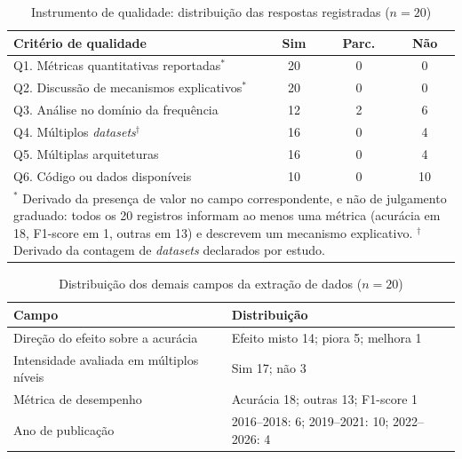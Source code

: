 \documentclass[conference]{IEEEtran}
\begin{document}
\begin{table}[htbp]
\caption{Instrumento de qualidade: distribuição das respostas registradas ($n=20$)}
\begin{center}
\footnotesize
\begin{tabular}{|p{4.5cm}|c|c|c|}
\hline
\textbf{Critério de qualidade} & \textbf{Sim} & \textbf{Parc.} & \textbf{Não} \\
\hline
Q1. Métricas quantitativas reportadas$^{\ast}$ & 20 & 0 & 0 \\
\hline
Q2. Discussão de mecanismos explicativos$^{\ast}$ & 20 & 0 & 0 \\
\hline
Q3. Análise no domínio da frequência & 12 & 2 & 6 \\
\hline
Q4. Múltiplos \textit{datasets}$^{\dagger}$ & 16 & 0 & 4 \\
\hline
Q5. Múltiplas arquiteturas & 16 & 0 & 4 \\
\hline
Q6. Código ou dados disponíveis & 10 & 0 & 10 \\
\hline
\multicolumn{4}{|p{6.9cm}|}{\footnotesize $^{\ast}$ Derivado da presença de valor no campo correspondente, e não de julgamento graduado: todos os 20 registros informam ao menos uma métrica (acurácia em 18, F1-score em 1, outras em 13) e descrevem um mecanismo explicativo. $^{\dagger}$ Derivado da contagem de \textit{datasets} declarados por estudo.} \\
\hline
\end{tabular}
\label{tab:qualidade}
\end{center}
\end{table}

\begin{table}[htbp]
\caption{Distribuição dos demais campos da extração de dados ($n=20$)}
\begin{center}
\footnotesize
\begin{tabular}{|p{3.6cm}|p{3.3cm}|}
\hline
\textbf{Campo} & \textbf{Distribuição} \\
\hline
Direção do efeito sobre a acurácia & Efeito misto 14; piora 5; melhora 1 \\
\hline
Intensidade avaliada em múltiplos níveis & Sim 17; não 3 \\
\hline
Métrica de desempenho & Acurácia 18; outras 13; F1-score 1 \\
\hline
Ano de publicação & 2016--2018: 6; 2019--2021: 10; 2022--2026: 4 \\
\hline
\end{tabular}
\label{tab:extracao}
\end{center}
\end{table}
\end{document}
